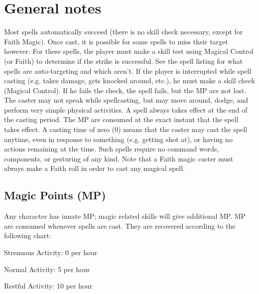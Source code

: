 \documentclass[twoside]{book}
\begin{document}
\section{General notes}
      Most spells automatically succeed (there is no skill
             check necessary, except for Faith Magic). Once cast, it is
             possible for some spells to miss their target however. For
             these spells, the player must make a skill test using
             Magical Control (or Faith) to determine if the strike is
             successful. See the spell listing for what spells are
             auto-targeting and which aren't.   If the player is interrupted while spell casting (e.g.
            takes damage, gets knocked around, etc.), he must make a
            skill check (Magical Control). If he fails the check, the
            spell fails, but the MP are not lost.
               The caster may not speak while spellcasting, but may
               move around, dodge, and perform very simple physical
               activities. 
            A spell always takes effect at the end of the casting
             period. The MP are consumed at the exact instant that the
             spell takes effect.   A casting time of zero (0) means that the caster may
             cast the spell anytime, even in response to something (e.g.
             getting shot at), or having no actions remaining at the
             time. Such spells require no command words, components, or
             gesturing of any kind.   Note that a Faith magic caster must always make a
             Faith roll in order to cast any magical spell. 
\subsection{Magic Points (MP)}
      Any character has innate MP; magic related skills
               will give additional MP.   MP are consumed whenever spells are cast. They are
               recovered according to the following chart:   
                
                  
                    
                    
                  
                  
                   Strenuous Activity: 
                   0 per hour   
                  
                  
                   Normal Activity: 
                   5 per hour   
                  
                  
                   Restful Activity: 
                   10 per hour   
                  
\end{document}
